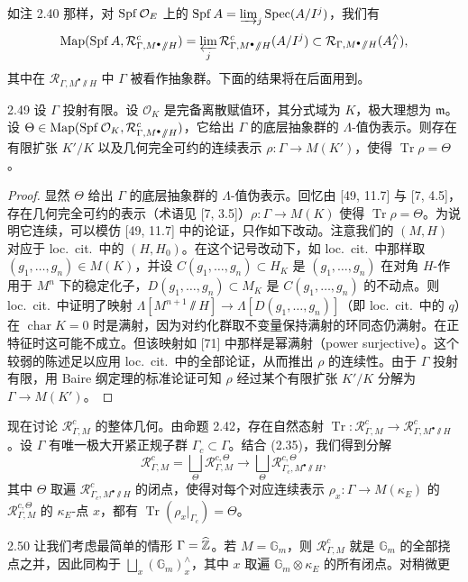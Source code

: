 如注 2.40 那样，对 $\operatorname{Spf}\mathcal O_E$ 上的 $\operatorname{Spf} A = \varinjlim_j \operatorname{Spec}(A/I^j)$，我们有
\[
\operatorname{Map}(\operatorname{Spf} A, \mathcal R^c_{\Gamma,M^\bullet\sslash H}) = \varprojlim_j \mathcal R^c_{\Gamma,M^\bullet\sslash H}(A/I^j) \subset \mathcal R_{\Gamma,M^\bullet\sslash H}(A^\wedge_I),
\]
其中在 $\mathcal R_{\Gamma,M^\bullet\sslash H}$ 中 $\Gamma$ 被看作抽象群。下面的结果将在后面用到。

\begin{prop}{2.49}
设 $\Gamma$ 投射有限。设 $\mathcal O_K$ 是完备离散赋值环，其分式域为 $K$，极大理想为 $\mathfrak m$。设 $\Theta \in \operatorname{Map}(\operatorname{Spf}\mathcal O_K, \mathcal R^c_{\Gamma,M^\bullet\sslash H})$，它给出 $\Gamma$ 的底层抽象群的 $\Lambda$-值伪表示。则存在有限扩张 $K'/K$ 以及几何完全可约的连续表示 $\rho\colon \Gamma \to M(K')$，使得 $\operatorname{Tr}\rho = \Theta$。
\label{prop:zhu2-2-49}
\end{prop}

\begin{proof}
显然 $\Theta$ 给出 $\Gamma$ 的底层抽象群的 $\Lambda$-值伪表示。回忆由 [49, 11.7] 与 [7, 4.5]，存在几何完全可约的表示（术语见 [7, 3.5]）$\rho\colon \Gamma \to M(K)$ 使得 $\operatorname{Tr}\rho = \Theta$。为说明它连续，可以模仿 [49, 11.7] 中的论证，只作如下改动。注意我们的 $(M,H)$ 对应于 loc.\ cit.\ 中的 $(H,H_0)$。在这个记号改动下，如 loc.\ cit.\ 中那样取 $(g_1,\dots,g_n) \in M(K)$，并设 $C(g_1,\dots,g_n) \subset H_K$ 是 $(g_1,\dots,g_n)$ 在对角 $H$-作用于 $M^n$ 下的稳定化子，$D(g_1,\dots,g_n) \subset M_K$ 是 $C(g_1,\dots,g_n)$ 的不动点。则 loc.\ cit.\ 中证明了映射 $\Lambda[M^{n+1}\sslash H] \to \Lambda[D(g_1,\dots,g_n)]$（即 loc.\ cit.\ 中的 $q$）在 $\operatorname{char}K = 0$ 时是满射，因为对约化群取不变量保持满射的环同态仍满射。在正特征时这可能不成立。但该映射如 [71] 中那样是幂满射（power surjective）。这个较弱的陈述足以应用 loc.\ cit.\ 中的全部论证，从而推出 $\rho$ 的连续性。由于 $\Gamma$ 投射有限，用 Baire 纲定理的标准论证可知 $\rho$ 经过某个有限扩张 $K'/K$ 分解为 $\Gamma \to M(K')$。
\end{proof}

现在讨论 $\mathcal R^c_{\Gamma,M}$ 的整体几何。由命题 2.42，存在自然态射 $\operatorname{Tr}\colon \mathcal R^c_{\Gamma,M} \to \mathcal R^c_{\Gamma,M^\bullet\sslash H}$。设 $\Gamma$ 有唯一极大开紧正规子群 $\Gamma_c \subset \Gamma$。结合 (2.35)，我们得到分解
\begin{equation}
\tag{2.36}
\mathcal R^c_{\Gamma,M} = \bigsqcup_\Theta \mathcal R^{c,\Theta}_{\Gamma,M} \to \bigsqcup_\Theta \mathcal R^{c,\Theta}_{\Gamma_c,M^\bullet\sslash H},
\end{equation}
其中 $\Theta$ 取遍 $\mathcal R^c_{\Gamma_c,M^\bullet\sslash H}$ 的闭点，使得对每个对应连续表示 $\rho_x\colon \Gamma \to M(\kappa_E)$ 的 $\mathcal R^{c,\Theta}_{\Gamma,M}$ 的 $\kappa_E$-点 $x$，都有 $\operatorname{Tr}(\rho_x|_{\Gamma_c}) = \Theta$。

\begin{exam}{2.50}
让我们考虑最简单的情形 $\Gamma = \widehat{\mathbb{Z}}$。若 $M = \mathbb G_m$，则 $\mathcal R^c_{\Gamma,M}$ 就是 $\mathbb G_m$ 的全部挠点之并，因此同构于 $\bigsqcup_x(\mathbb G_m)^\wedge_x$，其中 $x$ 取遍 $\mathbb G_m\otimes\kappa_E$ 的所有闭点。对稍微更
\end{exam}

